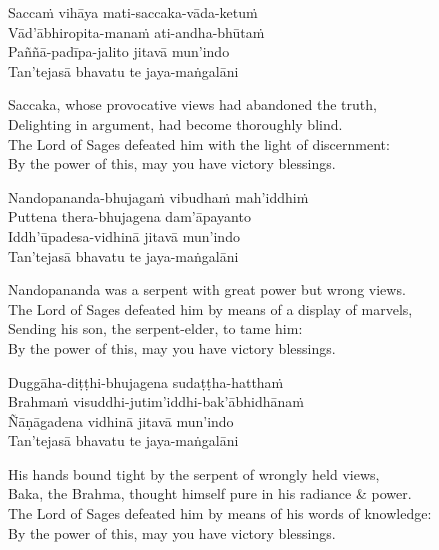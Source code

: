 \begin{pali-hang-continued}
  Saccaṁ vihāya mati-saccaka-vāda-ketuṁ\\
  Vād'ābhiropita-manaṁ ati-andha-bhūtaṁ\\
  Paññā-padīpa-jalito jitavā mun'indo\\
  Tan'tejasā bhavatu te jaya-maṅgalāni
\end{pali-hang-continued}

\begin{english-verses}
  Saccaka, whose provocative views had abandoned the truth,\\
  Delighting in argument, had become thoroughly blind.\\
  The Lord of Sages defeated him with the light of discernment:\\
  By the power of this, may you have victory blessings.
\end{english-verses}

\begin{pali-hang-continued}
  Nandopananda-bhujagaṁ vibudhaṁ mah'iddhiṁ\\
  Puttena thera-bhujagena dam'āpayanto\\
  Iddh'ūpadesa-vidhinā jitavā mun'indo\\
  Tan'tejasā bhavatu te jaya-maṅgalāni
\end{pali-hang-continued}

\begin{english-verses}
  Nandopananda was a serpent with great power but wrong views.\\
  The Lord of Sages defeated him by means of a display of marvels,\\
  Sending his son, the serpent-elder, to tame him:\\
  By the power of this, may you have victory blessings.
\end{english-verses}

\begin{pali-hang-continued}
  Duggāha-diṭṭhi-bhujagena sudaṭṭha-hatthaṁ\\
  Brahmaṁ visuddhi-jutim'iddhi-bak'ābhidhānaṁ\\
  Ñāṇāgadena vidhinā jitavā mun'indo\\
  Tan'tejasā bhavatu te jaya-maṅgalāni
\end{pali-hang-continued}

\begin{english-verses}
  His hands bound tight by the serpent of wrongly held views,\\
  Baka, the Brahma, thought himself pure in his radiance \& power.\\
  The Lord of Sages defeated him by means of his words of knowledge:\\
  By the power of this, may you have victory blessings.
\end{english-verses}

